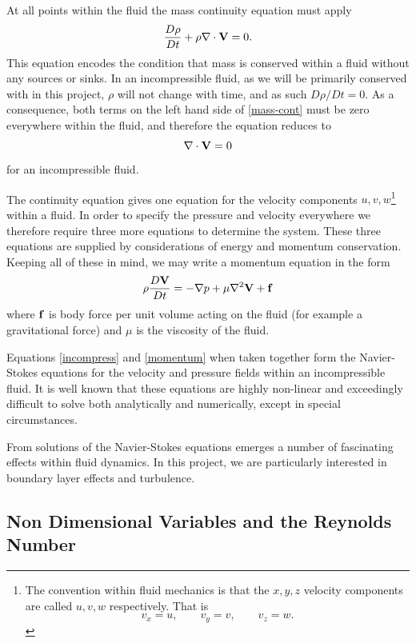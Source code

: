 At all points within the fluid the mass continuity equation must apply
\begin{equation} \label{mass-cont}
\frac{D\rho}{Dt} + \rho \nabla \cdot \mathbf{V} = 0 .
\end{equation}
This equation encodes the condition that mass is conserved within a fluid without any sources or sinks.
In an incompressible fluid, as we will be primarily conserved with in this project, $\rho$ will not
change with time, and as such $D \rho / D t = 0$. As a consequence, both terms on the left hand side of
\eqref{mass-cont} must be zero everywhere within the fluid, and therefore the equation reduces to
\begin{equation} \label{incompress}
\nabla \cdot \mathbf{V} = 0
\end{equation}
for an incompressible fluid.

The continuity equation gives one equation for the velocity components $u,v,w$\footnote{
	The convention within fluid mechanics is that the $x,y,z$ velocity components are called $u,v,w$
	respectively. That is \[
		v_x = u, \qquad v_y = v, \qquad v_z = w .
	\]
} within a fluid. In order to specify the pressure and velocity everywhere we therefore require three
more equations to determine the system. These three equations are supplied by considerations of
energy and momentum conservation. Keeping all of these in mind, we may write a
momentum equation in the form
\begin{equation} \label{momentum}
\rho \frac{D\mathbf{V}}{Dt} = - \nabla p + \mu \nabla^2 \mathbf{V} + \mathbf{f}
\end{equation}
where $\mathbf{f}$ is body force per unit volume acting on the fluid (for example a gravitational force) 
and $\mu$ is the viscosity of the fluid.

Equations \eqref{incompress} and \eqref{momentum} when taken together form the Navier-Stokes equations
for the velocity and pressure fields within an incompressible fluid. It is well known that these
equations are highly non-linear and exceedingly difficult to solve both analytically and numerically,
except in special circumstances.

From solutions of the Navier-Stokes equations emerges a number of fascinating effects within fluid 
dynamics. In this project, we are particularly interested in boundary layer effects and turbulence.

\subsection{Non Dimensional Variables and the Reynolds Number}

